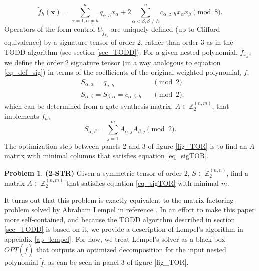 \documentclass[notitlepage]{article}
\theoremstyle{definition}
\theoremstyle{problem}
\newtheorem{problem}{Problem}[section]
\theoremstyle{lemma}
\begin{document}
\begin{equation}
\tilde{f}_h(\mathbf{x}) = \sum_{\alpha=1, \alpha\neq h}^n q_{\alpha,h} x_\alpha + 2\sum_{\alpha<\beta,\beta\neq h}^{n}c_{\alpha,\beta,h}x_\alpha x_\beta \pmod{8}.
\end{equation}
Operators of the form control-$U_{\tilde{f}_{x_h}}$ are uniquely defined (up to Clifford equivalence) by a signature tensor of order 2, rather than order 3 as in the TODD algorithm (see section \ref{sec_TODD}). For a given nested polynomial, $\tilde{f}_{x_h}$, we define the order 2 signature tensor (in a way analogous to equation \ref{eq_def_sig}) in terms of the coefficients of the original weighted polynomial, $f$,
\begin{align}
&S_{\alpha,\alpha} = q_{a,h} &&\pmod{2} \\
&S_{\alpha,\beta} = S_{\beta,\alpha} = c_{\alpha,\beta,h} &&\pmod{2},
\end{align}
which can be determined from a gate synthesis matrix, $A\in \mathbb{Z}_2^{(n,m)}$, that implements $\tilde{f}_h$,
\begin{equation}
\label{eq_sigTOR}
S_{\alpha,\beta} = \sum_{j=1}^{m}A_{\alpha,j}A_{\beta,j} \pmod{2}.
\end{equation}
The optimization step between panels 2 and 3 of figure \ref{fig_TOR} is to find an $A$ matrix with minimal columns that satisfies equation \ref{eq_sigTOR}.
\begin{problem}{\textbf{(2-STR)}}
	Given a symmetric tensor of order 2, $S\in \mathbb{Z}_2^{(n,n)}$, find a matrix $A \in \mathbb{Z}_2^{(n,m)}$ that satisfies equation \ref{eq_sigTOR} with minimal $m$.
\end{problem}
It turns out that this problem is exactly equivalent to the matrix factoring problem solved by Abraham Lempel in reference \cite{8_Lempel_1975}. In an effort to make this paper more self-contained, and because the TODD algorithm described in section \ref{sec_TODD} is based on it, we provide a description of Lempel's algorithm in appendix \ref{ap_lempel}. For now, we treat Lempel's solver as a black box $OPT(\tilde{f})$ that outputs an optimized decomposition for the input nested polynomial $\tilde{f}$, as can be seen in panel 3 of figure \ref{fig_TOR}.

\end{document}
